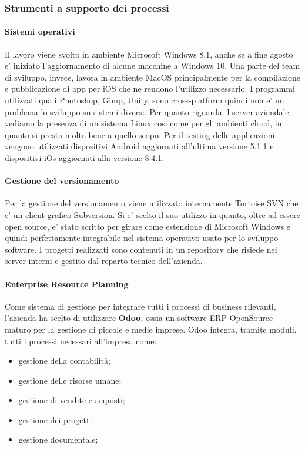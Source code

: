 \subsubsection{Strumenti a supporto dei processi}
\paragraph{Sistemi operativi}
Il lavoro viene svolto in ambiente Microsoft Windows 8.1, anche se a fine agosto e' iniziato l'aggiornamento di alcune macchine a Windows 10. Una parte del team di sviluppo, invece, lavora in ambiente MacOS principalmente per la compilazione e pubblicazione di app per iOS che ne rendono l'utilizzo necessario. I programmi utilizzati quali Photoshop, Gimp, Unity, sono cross-platform quindi non e' un problema lo sviluppo su sistemi diversi. 
Per quanto riguarda il server aziendale vediamo la presenza di un sistema Linux cosi come per gli ambienti cloud, in quanto si presta molto bene a quello scopo.
Per il testing delle applicazioni vengono utilizzati dispositivi Android aggiornati all'ultima versione 5.1.1 e dispositivi iOs aggiornati alla versione 8.4.1.

\paragraph{Gestione del versionamento}
Per la gestione del versionamento viene utilizzato internamente Tortoise SVN che e' un client grafico Subversion. Si e' scelto il suo utilizzo in quanto, oltre ad essere open source, e' stato scritto per girare come estensione di Microsoft Windows e quindi perfettamente integrabile nel sistema operativo usato per lo sviluppo software.
I progetti realizzati sono contenuti in un repository che risiede nei server interni e gestito dal reparto tecnico dell'azienda.

\paragraph{Enterprise Resource Planning}
Come sistema di gestione per integrare tutti i processi di business rilevanti, l'azienda ha scelto di utilizzare \textbf{Odoo}, ossia un software ERP OpenSource maturo per la gestione di piccole e medie imprese. 
Odoo integra, tramite moduli, tutti i processi necessari all'impresa come:
\begin{itemize}
	\item gestione della contabilità;
	\item gestione delle risorse umane;
	\item gestione di vendite e acquisti;
	\item gestione dei progetti;
	\item gestione documentale;
\end{itemize}

